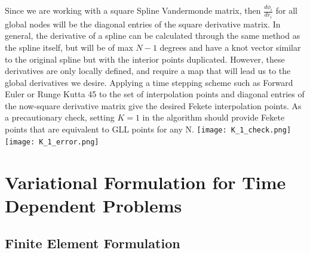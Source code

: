 \documentclass{article}
\begin{document}
Since we are working with a square Spline Vandermonde matrix, then $\frac{d\phi_i}{dr_i}$ for all global nodes will be the diagonal entries of the square derivative matrix. In general, the derivative of a spline can be calculated through the same method as the spline itself, but will be of max $N-1$ degrees and have a knot vector similar to the original spline but with the interior points duplicated. However, these derivatives are only locally defined, and require a map that will lead us to the global derivatives we desire. Applying a time stepping scheme such as Forward Euler or Runge Kutta 45 to the set of interpolation points and diagonal entries of the now-square derivative matrix give the desired Fekete interpolation points. As a precautionary check, setting $K=1$ in the algorithm should provide Fekete points that are equivalent to GLL points for any N.
\newline\newline\newline
\texttt{[image: K\_1\_check.png]} \texttt{[image: K\_1\_error.png]}

\section*{Variational Formulation for Time Dependent Problems}
\subsection*{Finite Element Formulation}
\end{document}
